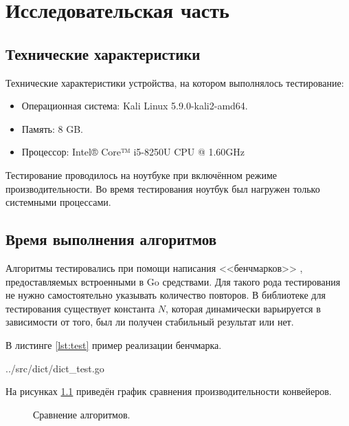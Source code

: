 \chapter{Исследовательская часть}

\section{Технические характеристики}

Технические характеристики устройства, на котором выполнялось тестирование:

\begin{itemize}
	\item Операционная система: Kali \cite{kali} Linux \cite{linux} 5.9.0-kali2-amd64.
	\item Память: 8 GB.
	\item Процессор: Intel® Core™ i5-8250U \cite{intel} CPU @ 1.60GHz
\end{itemize}

Тестирование проводилось на ноутбуке при включённом режиме производительности. Во время тестирования ноутбук был нагружен только системными процессами.


\section{Время выполнения алгоритмов}

Алгоритмы тестировались при помощи написания <<бенчмарков>> \cite{gotest}, предоставляемых встроенными в Go средствами. Для такого рода тестирования не нужно самостоятельно указывать количество повторов. В библиотеке для тестирования существует константа $N$, которая динамически варьируется в зависимости от того, был ли получен стабильный результат или нет.

В листинге \ref{lst:test} пример реализации бенчмарка.

\begin{lstinputlisting}[
	caption={Реализация бенчмарка},
	label={lst:test},
	style={go},
	linerange={8-13},
	]{../src/dict/dict_test.go}
\end{lstinputlisting}

На рисунках \ref{plt:time} приведён график сравнения производительности конвейеров.

\begin{figure}[h]
	\centering
	\captionsetup{justification=centering}
	\caption{Сравнение алгоритмов.}
	\label{plt:time}
\end{figure}

